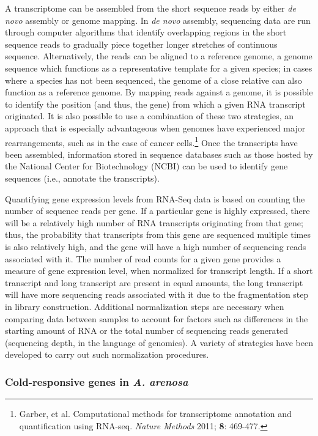 A transcriptome can be assembled from the short sequence reads by either \textit{de novo} assembly or genome mapping. In \textit{de novo} assembly, sequencing data are run through computer algorithms that identify overlapping regions in the short sequence reads to gradually piece together longer stretches of continuous sequence.  Alternatively, the reads can be aligned to a reference genome, a genome sequence which functions as a representative template for a given species; in cases where a species has not been sequenced, the genome of a close relative can also function as a reference genome. By mapping reads against a genome, it is possible to identify the position (and thus, the gene) from which a given RNA transcript originated. It is also possible to use a combination of these two strategies, an approach that is especially advantageous when genomes have experienced major rearrangements, such as in the case of cancer cells.\footnote{Garber, et al. Computational methods for transcriptome annotation and quantification using RNA-seq. \textit{Nature Methods} 2011; \textbf{8}: 469-477.} Once the transcripts have been assembled, information stored in sequence databases such as those hosted by the National Center for Biotechnology (NCBI) can be used to identify gene sequences (i.e., annotate the transcripts).

Quantifying gene expression levels from RNA-Seq data is based on counting the number of sequence reads per gene. If a particular gene is highly expressed, there will be a relatively high number of RNA transcripts originating from that gene; thus, the probability that transcripts from this gene are sequenced multiple times is also relatively high, and the gene will have a high number of sequencing reads associated with it. The number of read counts for a given gene provides a measure of gene expression level, when normalized for transcript length. If a short transcript and long transcript are present in equal amounts, the long transcript will have more sequencing reads associated with it due to the fragmentation step in library construction. Additional normalization steps are necessary when comparing data between samples to account for factors such as differences in the starting amount of RNA or the total number of sequencing reads generated (sequencing depth, in the language of genomics). A variety of strategies have been developed to carry out such normalization procedures.

\subsubsection{Cold-responsive genes in \textit{A. arenosa}}

